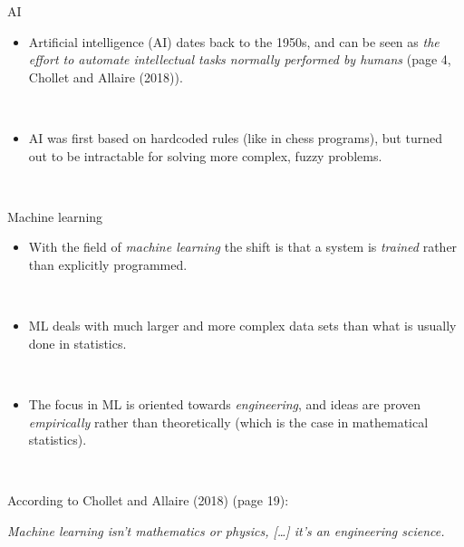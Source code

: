 \documentclass[
  10pt,
  ignorenonframetext,
]{beamer}
\providecommand{\tightlist}{%
  \setlength{\itemsep}{0pt}\setlength{\parskip}{0pt}}
\begin{document}
\begin{frame}
\begin{block}{AI}
\protect\hypertarget{ai}{}
\(~\)

\begin{itemize}
\tightlist
\item
  Artificial intelligence (AI) dates back to the 1950s, and can be seen
  as \emph{the effort to automate intellectual tasks normally performed
  by humans} (page 4, Chollet and Allaire (2018)).
\end{itemize}

\(~\)

\begin{itemize}
\tightlist
\item
  AI was first based on hardcoded rules (like in chess programs), but
  turned out to be intractable for solving more complex, fuzzy problems.
\end{itemize}

\(~\)
\end{block}
\end{frame}

\begin{frame}
\begin{block}{Machine learning}
\protect\hypertarget{machine-learning}{}
\(~\)

\begin{itemize}
\tightlist
\item
  With the field of \emph{machine learning} the shift is that a system
  is \emph{trained} rather than explicitly programmed.
\end{itemize}

\(~\)

\begin{itemize}
\tightlist
\item
  ML deals with much larger and more complex data sets than what is
  usually done in statistics.
\end{itemize}

\(~\)

\begin{itemize}
\tightlist
\item
  The focus in ML is oriented towards \emph{engineering}, and ideas are
  proven \emph{empirically} rather than theoretically (which is the case
  in mathematical statistics).
\end{itemize}

\(~\)

According to Chollet and Allaire (2018) (page 19): \vspace{2mm}

\emph{Machine learning isn't mathematics or physics, {[}\ldots{]} it's
an engineering science.}
\end{block}
\end{frame}
\end{document}
